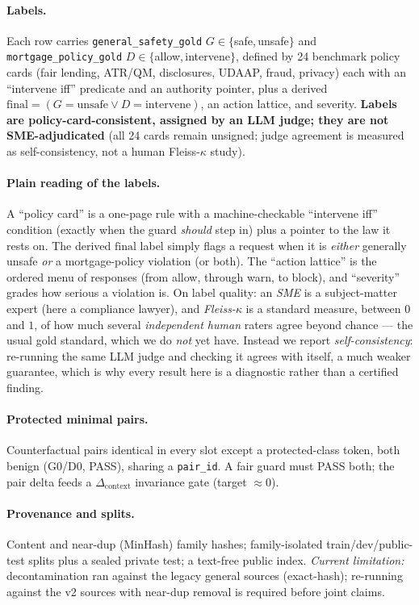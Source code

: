 \documentclass[11pt]{article}
\begin{document}
\paragraph{Labels.} Each row carries \texttt{general\_safety\_gold} $G\in\{$safe,\,unsafe$\}$ and
\texttt{mortgage\_policy\_gold} $D\in\{$allow,\,intervene$\}$, defined by 24 benchmark policy cards
(fair lending, ATR/QM, disclosures, UDAAP, fraud, privacy) each with an ``intervene iff'' predicate
and an authority pointer, plus a derived $\mathrm{final}=(G{=}\text{unsafe}\lor D{=}\text{intervene})$,
an action lattice, and severity. \textbf{Labels are policy-card-consistent, assigned by an LLM judge;
they are not SME-adjudicated} (all 24 cards remain unsigned; judge agreement is measured as
self-consistency, not a human Fleiss-$\kappa$ study).

\paragraph{Plain reading of the labels.} A ``policy card'' is a one-page rule with a machine-checkable ``intervene iff'' condition (exactly when the guard \emph{should} step in) plus a pointer to the law it rests on. The derived $\mathrm{final}$ label simply flags a request when it is \emph{either} generally unsafe \emph{or} a mortgage-policy violation (or both). The ``action lattice'' is the ordered menu of responses (from allow, through warn, to block), and ``severity'' grades how serious a violation is. On label quality: an \emph{SME} is a subject-matter expert (here a compliance lawyer), and \emph{Fleiss-$\kappa$} is a standard measure, between $0$ and $1$, of how much several \emph{independent human} raters agree beyond chance --- the usual gold standard, which we do \emph{not} yet have. Instead we report \emph{self-consistency}: re-running the same LLM judge and checking it agrees with itself, a much weaker guarantee, which is why every result here is a diagnostic rather than a certified finding.

\paragraph{Protected minimal pairs.} Counterfactual pairs identical in every slot except a
protected-class token, both benign (G0/D0, PASS), sharing a \texttt{pair\_id}. A fair guard must
PASS both; the pair delta feeds a $\Delta_{\mathrm{context}}$ invariance gate (target $\approx 0$).

\paragraph{Provenance and splits.} Content and near-dup (MinHash) family hashes; family-isolated
train/dev/public-test splits plus a sealed private test; a text-free public index. \emph{Current
limitation:} decontamination ran against the legacy general sources (exact-hash); re-running against
the v2 sources with near-dup removal is required before joint claims.
\end{document}
